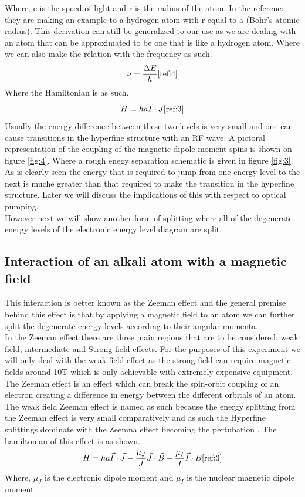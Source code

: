 \documentclass[twocolumn]{article}
\begin{document}
Where, c is the speed of light and r is the radius of the atom. In the 
reference they are making an example to a hydrogen atom with r equal to a 
(Bohr's atomic radius). This derivation can still be generalized to our use as 
we are dealing with an atom that can be approximated to be one that is like a 
hydrogen atom. Where we can also make the relation with the frequency as such.
\begin{equation}
\nu = \frac{\Delta E}{h}
\label{eqn:4}
\cite{ref:4}
\end{equation}
Where the Hamiltonian is as such.
\begin{equation}
H=ha\vec{I}\cdot\vec{J}
\label{eqn:5}
\cite{ref:3}
\end{equation}
Usually the energy difference between these two levels is very small and one 
can cause transitions in the hyperfine structure with an RF wave. A pictoral 
representation of the coupling of the magnetic dipole moment spins is shown on 
figure \ref{fig:4}. Where a rough enegy separation schematic is given in figure 
\ref{fig:3}. As is clearly seen the energy that is required to jump from one 
energy level to the next is muche greater than that required to make the 
transition in the hyperfine structure. Later we will discuss the implications 
of this with respect to optical pumping.
\\
However next we will show another form of splitting where all of the degenerate 
energy levels of the electronic energy level diagram are split.
\subsection{Interaction of an alkali atom with a magnetic field}
This interaction is better known as the Zeeman effect and the general premise 
behind this effect is that by applying a magnetic field to an atom we can 
further split the degenerate energy levels according to their angular momenta.
\\
In the Zeeman effect there are three main regions that are to be considered: 
weak field, intermediate and Strong field effects. For the purposes of this 
experiment we will only deal with the weak field effect as the strong field 
can require magnetic fields around 10T which is only achievable with 
extremely expensive equipment.
\\
The Zeeman effect is an effect which can break the spin-orbit coupling of an 
electron creating a difference in energy between the different orbitals of an 
atom. The weak field Zeeman effect is named as such because the energy 
splitting from the Zeeman effect is very small comparatively and as such the 
Hyperfine splittings dominate with the Zeemna effect becoming the pertubation 
\cite{ref:4}. The hamiltonian of this effect is as shown.
\begin{equation}
H=ha\vec{I}\cdot\vec{J}-\frac{\mu_J}{J}\vec{J}\cdot\vec{B}-\frac{\mu_I}{I}\vec{I}\cdot{B}
\label{eqn:6}
\cite{ref:3}
\end{equation}
Where, $\mu_J$ is the electronic dipole moment and $\mu_I$ is the nuclear 
magnetic dipole moment.
\end{document}
